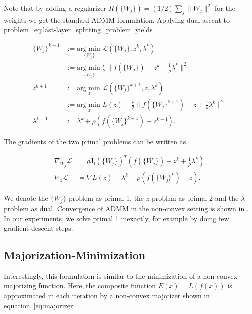 \documentclass[english,11pt,a4paper]{article}
\begin{document}
Note that by adding a regularizer $R(\{W_j\}) = (1/2) \sum_{j} \| W_j \|^2$ for the weights we get the standard ADMM formulation. Applying dual ascent to problem~\ref{eq:last-layer_splitting_problem} yields

\begin{equation}
	\begin{aligned}
		\{W_j\}^{k+1} &:= \underset{\{W_j\}}{\text{arg min }} \mathcal{L}(\{W_j\}, z^k, \lambda^k) \\
		&:= \underset{\{W_j\}}{\text{arg min }} \frac{\rho}{2} \| f(\{W_j\}) - z^k + \frac{1}{\rho} \lambda^k \|^2 \\
	
		z^{k+1} &:= \underset{z}{\text{arg min }} \mathcal{L}(\{W_j\}^{k+1}, z, \lambda^k) \\
		&:= \underset{z}{\text{arg min }} L(z) + \frac{\rho}{2} \| f(\{W_j\}^{k+1}) - z + \frac{1}{\rho} \lambda^k \|^2 \\
		
		\lambda^{k+1} &:= \lambda^k + \rho (f(\{W_j\}^{k+1})-z^{k+1}).
	\end{aligned}
\end{equation}

The gradients of the two primal problems can be written as

\begin{equation}
	\begin{aligned}
		\nabla_{W_j} \mathcal{L} &= \rho \mathrm{J_f}(\{W_j\})^T (f(\{W_j\}) - z^k + \frac{1}{\rho} \lambda^k) \\
		\nabla_z \mathcal{L} &= \nabla L(z) - \lambda^k - \rho (f(\{W_j\}^k) - z).
	\end{aligned}
\end{equation}

We denote the $\{W_j\}$ problem as primal 1, the $z$ problem as primal 2 and the $\lambda$ problem as dual. Convergence of ADMM in the non-convex setting is shown in \cite{hong2016convergence}. In our experiments, we solve primal 1 inexactly, for example by doing few gradient descent steps.

\subsection{Majorization-Minimization}

Interestingly, this formulation is similar to the minimization of a non-convex majorizing function. Here, the composite function $E(x) = L(f(x))$ is approximated in each iteration by a non-convex majorizer shown in equation~\ref{eq:majorizer}.
\end{document}
